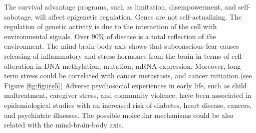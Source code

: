 \documentclass[12pt, a4paper]{article}
\begin{document}
The survival advantage programs, such as limitation, disempowerment, and self-sabotage, will affect epigenetic regulation.
Genes are not self-actualizing. %
The regulation of genetic activity is due to the interaction of the cell with environmental signals.
Over 90\% of disease is a total reflection of the environment.%
The mind-brain-body axis shows that subconscious fear causes releasing of inflammatory and stress hormones from the brain in terms of cell alteration in DNA methylation, mutation, mRNA expression. 
Moreover, long-term stress could be correlated with cancer metastasis\cite{Lutgendorf2010}\cite{Moreno-Smith2010}\cite{Du2020}\cite{Xu2021},
and cancer initiation\cite{Lutgendorf2010}\cite{Powell2013}\cite{Iftikhar2021}.(see Figure \ref{fig:figure5}) %
Adverse psychosocial experiences in early life, such as child maltreatment, caregiver stress, and community violence, have been associated in epidemiological studies with an increased risk of diabetes, heart disease, cancers, and psychiatric illnesses. 
The possible molecular mechanisms could be also related with the mind-brain-body axis\cite{Berens2017}.
\end{document}
